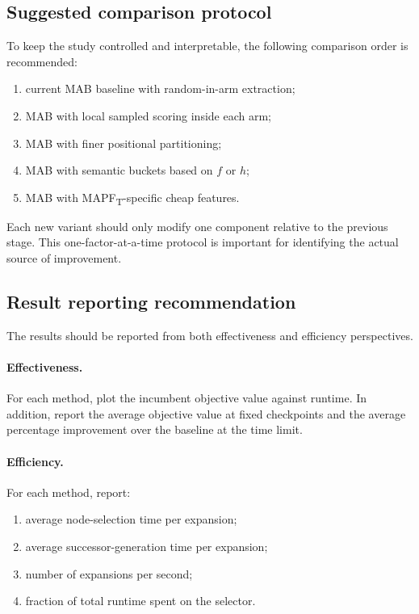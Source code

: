 \documentclass[lettersize,journal]{IEEEtran}
\begin{document}
\subsection{Suggested comparison protocol}

To keep the study controlled and interpretable, the following comparison order is recommended:
\begin{enumerate}[(1)]
    \item current MAB baseline with random-in-arm extraction;
    \item MAB with local sampled scoring inside each arm;
    \item MAB with finer positional partitioning;
    \item MAB with semantic buckets based on $f$ or $h$;
    \item MAB with MAPF\textsubscript{T}-specific cheap features.
\end{enumerate}

Each new variant should only modify one component relative to the previous stage. This one-factor-at-a-time protocol is important for identifying the actual source of improvement.

\subsection{Result reporting recommendation}

The results should be reported from both effectiveness and efficiency perspectives.

\paragraph{Effectiveness.}
For each method, plot the incumbent objective value against runtime. In addition, report the average objective value at fixed checkpoints and the average percentage improvement over the baseline at the time limit.

\paragraph{Efficiency.}
For each method, report:
\begin{enumerate}[(1)]
    \item average node-selection time per expansion;
    \item average successor-generation time per expansion;
    \item number of expansions per second;
    \item fraction of total runtime spent on the selector.
\end{enumerate}
\end{document}
